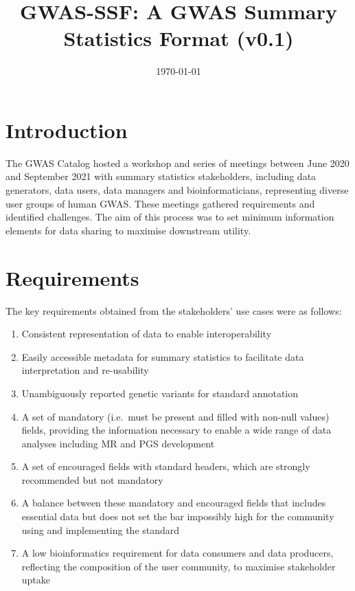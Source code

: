 \documentclass[11pt]{article}
\title{GWAS-SSF: A GWAS Summary Statistics Format (v0.1)}
\date{\today}
\begin{document}
\maketitle

\newpage
\tableofcontents

\newpage

\section{Introduction}
The GWAS Catalog hosted a workshop and series of meetings between June 2020 and September 2021 with summary statistics stakeholders, including data generators, data users, data managers and bioinformaticians, representing diverse user groups of human GWAS. These meetings gathered requirements and identified challenges. The aim of this process was to set minimum information elements for data sharing to maximise downstream utility.

\section{Requirements}

The key requirements obtained from the stakeholders’ use cases were as follows:

\begin{enumerate}
\item Consistent representation of data to enable interoperability
\item Easily accessible metadata for summary statistics to facilitate data interpretation and re-usability
\item Unambiguously reported genetic variants for standard annotation
\item A set of mandatory (i.e.\ must be present and filled with non-null values) fields, providing the information necessary to enable a wide range of data analyses including MR and PGS development
\item A set of encouraged fields with standard headers, which are strongly recommended but not mandatory 
\item A balance between these mandatory and encouraged fields that includes essential data but does not set the bar impossibly high for the community using and implementing the standard
\item A low bioinformatics requirement for data consumers and data producers, reflecting the composition of the user community, to maximise stakeholder uptake 
\end{enumerate}
\end{document}
